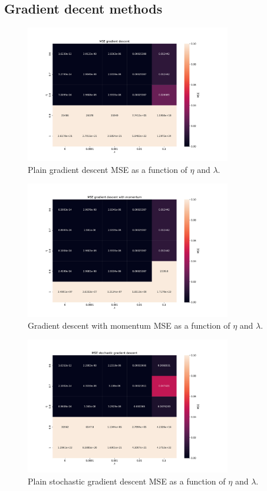 \subsection{Gradient decent methods}

\begin{figure}[H]
\centering
\includegraphics[width=0.8\textwidth]{Figures/PartA/gd_MSE(eta,lmb)}
\caption{Plain gradient descent MSE as a function of \(\eta \) and \(\lambda \).}
\label{fig:gd_MSE-eta-lmb-}
\end{figure}

\begin{figure}[H]
\centering
\includegraphics[width=0.8\textwidth]{Figures/PartA/gdm_MSE(eta,lmb)}
\caption{Gradient descent with momentum MSE as a function of \(\eta \) and \(\lambda \).}
\label{fig:gdm_MSE-eta-lmb-}
\end{figure}

\begin{figure}[H]
\centering
\includegraphics[width=0.8\textwidth]{Figures/PartA/sgd_MSE(eta,lmb)}
\caption{Plain stochastic gradient descent MSE as a function of \(\eta \) and \(\lambda \).}
\label{fig:sgd_MSE-eta-lmb-}
\end{figure}

